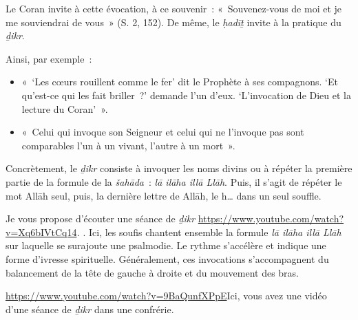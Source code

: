 Le Coran invite à cette évocation, à ce souvenir~: «~Souvenez-vous de
moi et je me souviendrai de vous~» (S. 2, 152). De même, le \emph{ḥadīṯ}
invite à la pratique du \emph{ḏikr}.

Ainsi, par exemple~:

\begin{itemize}
\item
  «~`Les cœurs rouillent comme le fer' dit le Prophète à ses compagnons.
  `Et qu'est-ce qui les fait briller~?' demande l'un d'eux.
  `L'invocation de Dieu et la lecture du Coran'~».
\item
  «~Celui qui invoque son Seigneur et celui qui ne l'invoque pas sont
  comparables l'un à un vivant, l'autre à un mort~».
\end{itemize}

Concrètement, le \emph{ḏikr} consiste à invoquer les noms divins ou à
répéter la première partie de la formule de la \emph{šahāda}~: \emph{lā
ilāha illā Llāh}. Puis, il s'agit de répéter le mot Allāh seul, puis, la
dernière lettre de Allāh, le h\ldots{} dans un seul souffle.

Je vous propose d'écouter {une séance de
\emph{ḏikr}
\url{https://www.youtube.com/watch?v=Xq6bIVtCq14}}\emph{.} 
. Ici, les soufis chantent
ensemble la formule \emph{lā ilāha illā Llāh} sur laquelle se surajoute
une psalmodie. Le rythme s'accélère et indique une forme d'ivresse
spirituelle. Généralement, ces invocations s'accompagnent du balancement
de la tête de gauche à droite et du mouvement des bras.

\url{https://www.youtube.com/watch?v=9BaQunfXPpE}{Ici}, vous avez une
vidéo d'une séance de \emph{ḏikr} dans une confrérie.


